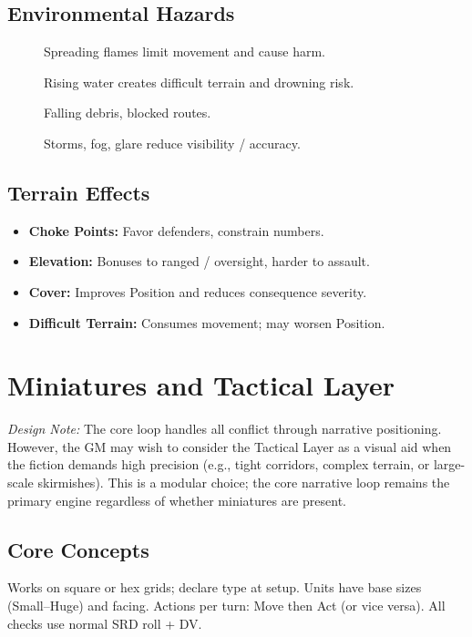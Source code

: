 \subsection{Environmental Hazards}\label{subsec:environmental_hazards}
\begin{description}
    \item[] Spreading flames limit movement and cause harm.
    \item[] Rising water creates difficult terrain and drowning risk.
    \item[] Falling debris, blocked routes.
    \item[] Storms, fog, glare reduce visibility / accuracy.
\end{description}

\subsection{Terrain Effects}\label{subsec:terrain_effects}
\begin{itemize}
    \item \textbf{Choke Points:} Favor defenders, constrain numbers.
    \item \textbf{Elevation:} Bonuses to ranged / oversight, harder to assault.
    \item \textbf{Cover:} Improves Position and reduces consequence severity.
    \item \textbf{Difficult Terrain:} Consumes movement; may worsen Position.
\end{itemize}

\section{Miniatures and Tactical Layer}\label{sec:miniatures}

\textit{Design Note:} The core loop handles all conflict through narrative positioning. However, the GM may wish to consider the Tactical Layer as a visual aid when the fiction demands high precision (e.g., tight corridors, complex terrain, or large-scale skirmishes). This is a modular choice; the core narrative loop remains the primary engine regardless of whether miniatures are present.

\subsection{Core Concepts}
Works on square or hex grids; declare type at setup. Units have base sizes (Small--Huge) and facing. Actions per turn: Move then Act (or vice versa). All checks use normal SRD roll + DV.

